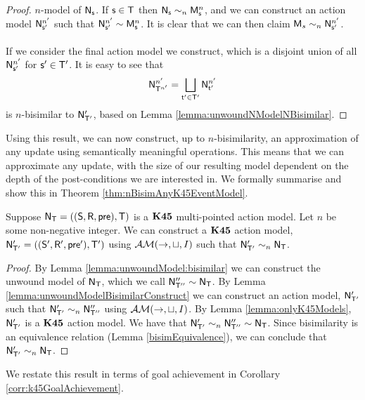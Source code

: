 \begin{proof}
	$n$-model of $\evM_\evs$.
	If $\evs \in \evT$ then $\evM_\evs \sim_n \evMM^{n}_\evs$, and we can construct an action model
	$\evM^{n'}_{\evs'}$ such that $\evM^{n'}_{\evs'} \sim \evMM^{n}_\evs$.
	It is clear that we can then claim $\evMM_s \sim_n \evM^{n'}_{\evs'}$.\\
	\\
	If we consider the final action model we construct, which is a disjoint union of all
	$\evM^{n'}_{\evs'}$ for $\evs' \in \evT'$.
	It is easy to see that
	\[
		\evM^{n'}_{\evT^{n'}} = \bigsqcup_{\evt' \in \evT'} \evM^{n'}_{\evt'}
	\]
	is $n$-bisimilar to $\evM'_{\evT'}$, based on Lemma \ref{lemma:unwoundNModelNBisimilar}.
\end{proof}

Using this result, we can now construct, up to $n$-bisimilarity, an
approximation of any update using semantically meaningful operations.
This means that we can approximate any update, with the size of our resulting
model dependent on the depth of the post-conditions we are interested in.
We formally summarise and show this in Theorem
\ref{thm:nBisimAnyK45EventModel}.

\begin{thm} \label{thm:nBisimAnyK45EventModel}
  Suppose $\evM_\evT = ((\evS,\evR,\evpr),\evT)$ is a $\AXKFF$ multi-pointed
  action model.
  Let $n$ be some non-negative integer.
  We can construct a $\AXKFF$ action model, $\evM'_{\evT'} =
  ((\evS',\evR',\evpr'),\evT')$ using
  $\EM(\to,\sqcup,I)$ such that $\evM'_{\evT'} \sim_n \evM_\evT$.
\end{thm}
\begin{proof}
  By Lemma \ref{lemma:unwoundModel:bisimilar} we can construct the unwound model
  of $\evM_\evT$, which we call $\evM''_{\evT''} \sim \evM_{\evT}$.
	By Lemma \ref{lemma:unwoundModelBisimilarConstruct} we can construct an action model, $\evM'_{\evT'}$ such that
  $\evM'_{\evT'} \sim_n \evM''_{\evT''}$ using $\EM(\to,\sqcup,I)$.
  By Lemma \ref{lemma:onlyK45Models}, $\evM'_{\evT'}$ is a $\AXKFF$ action model.
  We have that $\evM'_{\evT'} \sim_n \evM''_{\evT''} \sim \evM_\evT$.
	Since bisimilarity is an equivalence relation (Lemma \ref{bisimEquivalence}), we can conclude that
  $\evM'_{\evT'} \sim_n \evM_\evT$.
\end{proof}

We restate this result in terms of goal achievement in Corollary
\ref{corr:k45GoalAchievement}.

